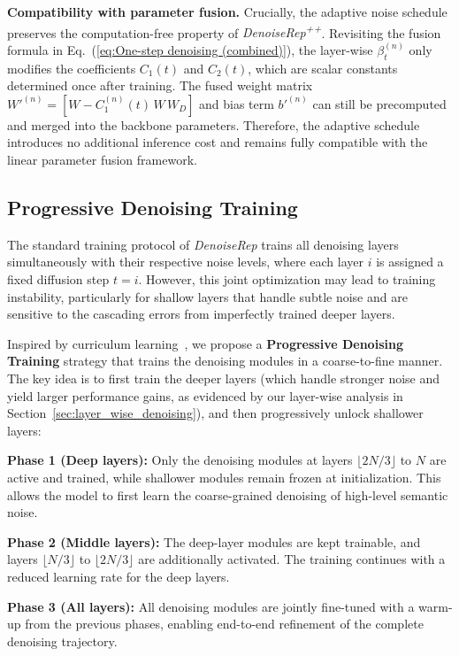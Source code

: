 \documentclass[conference]{IEEEtran}
\begin{document}
{{\textbf{Compatibility with parameter fusion.}
Crucially, the adaptive noise schedule preserves the computation-free property of \textit{DenoiseRep\textsuperscript{++}}. Revisiting the fusion formula in Eq.~(\ref{eq:One-step denoising (combined)}), the layer-wise $\beta_t^{(n)}$ only modifies the coefficients $C_1(t)$ and $C_2(t)$, which are scalar constants determined once after training. The fused weight matrix $W'^{(n)} = [W - C_1^{(n)}(t)\, W\, W_D]$ and bias term $b'^{(n)}$ can still be precomputed and merged into the backbone parameters. Therefore, the adaptive schedule introduces no additional inference cost and remains fully compatible with the linear parameter fusion framework.


\subsection{Progressive Denoising Training}
\label{sec:method_progressive}

The standard training protocol of \textit{DenoiseRep} trains all denoising layers simultaneously with their respective noise levels, where each layer $i$ is assigned a fixed diffusion step $t = i$. However, this joint optimization may lead to training instability, particularly for shallow layers that handle subtle noise and are sensitive to the cascading errors from imperfectly trained deeper layers.

Inspired by curriculum learning~\cite{bengio2009curriculum}, we propose a \textbf{Progressive Denoising Training} strategy that trains the denoising modules in a coarse-to-fine manner. The key idea is to first train the deeper layers (which handle stronger noise and yield larger performance gains, as evidenced by our layer-wise analysis in Section~\ref{sec:layer_wise_denoising}), and then progressively unlock shallower layers:

\textbf{Phase 1 (Deep layers):} Only the denoising modules at layers $\lfloor 2N/3 \rfloor$ to $N$ are active and trained, while shallower modules remain frozen at initialization. This allows the model to first learn the coarse-grained denoising of high-level semantic noise.

\textbf{Phase 2 (Middle layers):} The deep-layer modules are kept trainable, and layers $\lfloor N/3 \rfloor$ to $\lfloor 2N/3 \rfloor$ are additionally activated. The training continues with a reduced learning rate for the deep layers.

\textbf{Phase 3 (All layers):} All denoising modules are jointly fine-tuned with a warm-up from the previous phases, enabling end-to-end refinement of the complete denoising trajectory.

}}
\end{document}

